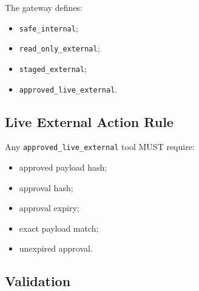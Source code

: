 The gateway defines:

\begin{itemize}
  \item \texttt{safe\_internal};
  \item \texttt{read\_only\_external};
  \item \texttt{staged\_external};
  \item \texttt{approved\_live\_external}.
\end{itemize}

\subsection{Live External Action Rule}

Any \texttt{approved\_live\_external} tool MUST require:

\begin{itemize}
  \item approved payload hash;
  \item approval hash;
  \item approval expiry;
  \item exact payload match;
  \item unexpired approval.
\end{itemize}

\subsection{Validation}

